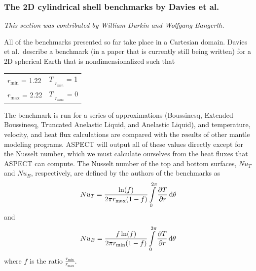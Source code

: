 \documentclass{article}
\newcommand{\aspect}{\textsc{ASPECT}}
\begin{document}
\subsubsection{The 2D cylindrical shell benchmarks by Davies et al.}
\label{sec:benchmark-2D_cylindrical_shell}

\textit{This section was contributed by William Durkin and Wolfgang Bangerth.}

All of the benchmarks presented so far take place in a Cartesian domain. 
Davies et al.~describe a benchmark (in a paper that is currently still being
written) for a 2D spherical Earth that is  
nondimensionalized such that 
\begin{table}[h]
 \centering
 \begin{tabular}{ l l }
    $r_{\min}$ = 1.22 &  $\left. T \right|_{r_{min}}$ = 1 \\
    $r_{\max}$ = 2.22 &  $\left. T \right|_{r_{max}}$ = 0
 \end{tabular}
\end{table}

The benchmark is run for a series of approximations (Boussinesq, Extended Boussinesq,
Truncated Anelastic Liquid, and Anelastic Liquid), and temperature, velocity, and heat flux 
calculations are compared with the results of other mantle modeling programs. \aspect{}
will output all of these values directly except for the Nusselt number, which
we must calculate ourselves from the heat fluxes that \aspect{} can compute.
The Nusselt number of the top and bottom surfaces, ${Nu}_T$ and ${Nu}_B$,
respectively, are defined by the authors of the benchmarks as
\begin{equation}
\label{eq:davies-NuTop}
{Nu}_{T} = \frac{\ln(f)}{2{\pi}r_{\max}(1-f)}\int \limits_{0}^{2\pi} \frac{\partial T}{\partial r}\, \text{d}\theta  \\
\end{equation}
and
\begin{equation*}
\label{eq:davies-NuBottom}
{Nu}_{B} = \frac{f \ln(f)}{2{\pi}r_{\min}(1-f)}\int \limits_{0}^{2\pi} \frac{\partial T}{\partial r}\, \text{d}\theta \\
\end{equation*}
where $f$ is the ratio $\frac{r_{\min}}{r_{\max}}$.
\end{document}
